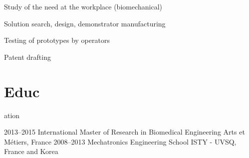 \documentclass{cv-style}     %
\begin{document}
\begin{entrylist}
{ Study of the need at the workplace (biomechanical)

 Solution search, design, demonstrator manufacturing

 Testing of prototypes by operators

 Patent drafting

 }


\end{entrylist}


\section{Educ}{ation}

\begin{entrylist}
\entry
{2013--2015}
{International Master of Research in Biomedical Engineering} %
{Arts et Métiers, France}
{}
\entry
{2008--2013}
{Mechatronics Engineering School} %
{ISTY - UVSQ, France and Korea}
{}
\end{entrylist}
\end{document}
